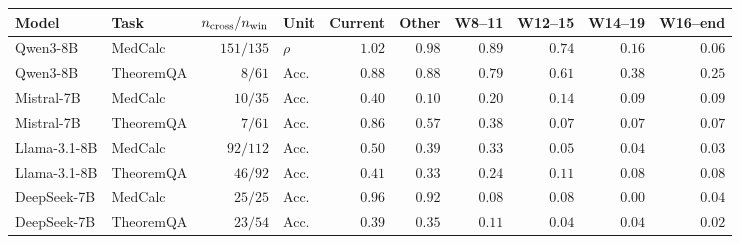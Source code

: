 \begin{tabular*}{\textwidth}{@{\extracolsep{\fill}}llrlrrrrrr@{}}
\toprule
Model & Task & $n_{\rm cross}/n_{\rm win}$ & Unit & Current & Other & W8--11 & W12--15 & W14--19 & W16--end \\
\midrule
Qwen3-8B & MedCalc & $151/135$ & $\rho$ & $1.02$ & $0.98$ & $0.89$ & $0.74$ & $0.16$ & $0.06$ \\
Qwen3-8B & TheoremQA & $8/61$ & Acc. & $0.88$ & $0.88$ & $0.79$ & $0.61$ & $0.38$ & $0.25$ \\
Mistral-7B & MedCalc & $10/35$ & Acc. & $0.40$ & $0.10$ & $0.20$ & $0.14$ & $0.09$ & $0.09$ \\
Mistral-7B & TheoremQA & $7/61$ & Acc. & $0.86$ & $0.57$ & $0.38$ & $0.07$ & $0.07$ & $0.07$ \\
Llama-3.1-8B & MedCalc & $92/112$ & Acc. & $0.50$ & $0.39$ & $0.33$ & $0.05$ & $0.04$ & $0.03$ \\
Llama-3.1-8B & TheoremQA & $46/92$ & Acc. & $0.41$ & $0.33$ & $0.24$ & $0.11$ & $0.08$ & $0.08$ \\
DeepSeek-7B & MedCalc & $25/25$ & Acc. & $0.96$ & $0.92$ & $0.08$ & $0.08$ & $0.00$ & $0.04$ \\
DeepSeek-7B & TheoremQA & $23/54$ & Acc. & $0.39$ & $0.35$ & $0.11$ & $0.04$ & $0.04$ & $0.02$ \\
\bottomrule
\end{tabular*}
